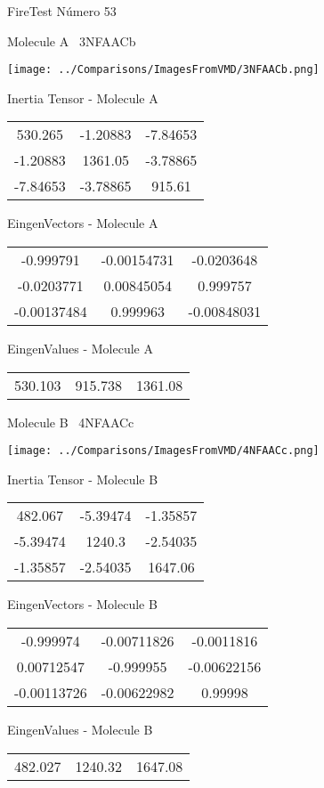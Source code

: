 \vtab[-3cm]
\begin{center}
{\large FireTest \tab Número 53}
\end{center}
\begin{multicols}{2}
\begin{center}

Molecule A \
3NFAACb

\texttt{[image: ../Comparisons/ImagesFromVMD/3NFAACb.png]}

Inertia Tensor - Molecule A \\
\begin{tabular}{|c c c|}
530.265	 & 	-1.20883	 & 	-7.84653	 \\
-1.20883	 & 	1361.05	 & 	-3.78865	 \\
-7.84653	 & 	-3.78865	 & 	915.61
\end{tabular}

\vtab
 EingenVectors - Molecule A     \\
\begin{tabular}{|c c c|}
-0.999791	 & 	-0.00154731	 & 	-0.0203648	 \\
-0.0203771	 & 	0.00845054	 & 	0.999757	 \\
-0.00137484	 & 	0.999963	 & 	-0.00848031
\end{tabular}

\vtab
 EingenValues - Molecule A     \\
\begin{tabular}{|c c c|}
530.103	 & 	915.738	 & 	1361.08	 \\
\end{tabular}
\columnbreak

Molecule B \
4NFAACc

\texttt{[image: ../Comparisons/ImagesFromVMD/4NFAACc.png]}

Inertia Tensor - Molecule B \\
\begin{tabular}{|c c c|}
482.067	 & 	-5.39474	 & 	-1.35857	 \\
-5.39474	 & 	1240.3	 & 	-2.54035	 \\
-1.35857	 & 	-2.54035	 & 	1647.06
\end{tabular}

\vtab
 EingenVectors - Molecule B     \\
\begin{tabular}{|c c c|}
-0.999974	 & 	-0.00711826	 & 	-0.0011816	 \\
0.00712547	 & 	-0.999955	 & 	-0.00622156	 \\
-0.00113726	 & 	-0.00622982	 & 	0.99998
\end{tabular}

\vtab
 EingenValues - Molecule B     \\
\begin{tabular}{|c c c|}
482.027	 & 	1240.32	 & 	1647.08	 \\
\end{tabular}

\end{center}
\end{multicols}

